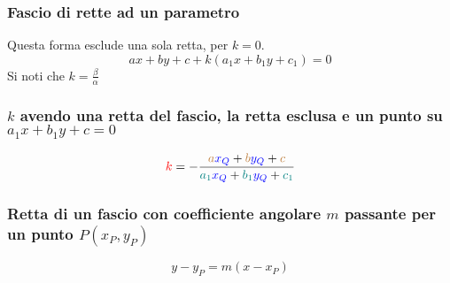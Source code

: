 \subsubsection{Fascio di rette ad un parametro}
Questa forma esclude una sola retta, per $k = 0$.
\begin{equation*}
  ax + by + c + k(a_1x + b_1y + c_1) = 0
\end{equation*}
Si noti che $k = \frac{\beta}{\alpha}$

\subsubsection{$k$ avendo una retta del fascio, la retta esclusa e un punto su $a_1x + b_1y + c = 0$}
\begin{center}
\end{center}
\begin{equation*}
  \mathcolor{red}{k} = -\frac{
    \mathcolor{brown}{a}\mathcolor{blue}{x_Q} + \mathcolor{brown}{b}\mathcolor{blue}{y_Q} +
    \mathcolor{brown}{c}
    }{
    \mathcolor{teal}{a_1}\mathcolor{blue}{x_Q} + \mathcolor{teal}{b_1}\mathcolor{blue}{y_Q} +
    \mathcolor{teal}{c_1}
  }
\end{equation*}

\subsubsection{Retta di un fascio con coefficiente angolare $m$ passante per un punto $P(x_P,y_P)$}
\begin{equation*}
  y-y_P = m(x-x_P)
\end{equation*}

